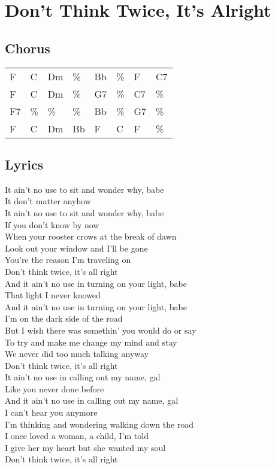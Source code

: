 \section{Don't Think Twice, It's Alright}


\subsection*{Chorus}


\begin{tabular}{l l l l l l l l}
F & C & Dm & \% & Bb & \% & F & C7 \\ 
F & C & Dm & \% & G7 & \% & C7 & \% \\ 
F7 & \% & \% & \% & Bb & \% & G7 & \% \\ 
F & C & Dm & Bb & F & C & F & \% \\ 
\end{tabular}


\subsection*{Lyrics}


It ain't no use to sit and wonder why, babe \\ 
It don't matter anyhow \\ 
It ain't no use to sit and wonder why, babe \\ 
If you don't know by now \\ 
When your rooster crows at the break of dawn \\ 
Look out your window and I'll be gone \\ 
You're the reason I'm traveling on \\ 
Don't think twice, it's all right \\ 

And it ain't no use in turning on your light, babe \\ 
That light I never knowed \\ 
And it ain't no use in turning on your light, babe \\ 
I'm on the dark side of the road \\ 
But I wish there was somethin' you would do or say \\ 
To try and make me change my mind and stay \\ 
We never did too much talking anyway \\ 
Don't think twice, it's all right \\ 

It ain't no use in calling out my name, gal \\ 
Like you never done before \\ 
And it ain't no use in calling out my name, gal \\ 
I can't hear you anymore \\ 
I'm thinking and wondering walking down the road \\ 
I once loved a woman, a child, I'm told \\ 
I give her my heart but she wanted my soul \\ 
Don't think twice, it's all right \\ 

